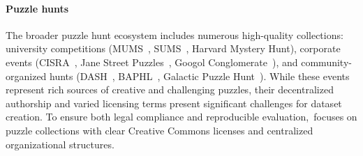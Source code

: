 \paragraph{Puzzle hunts}
The broader puzzle hunt ecosystem includes numerous high-quality collections: university competitions (MUMS~\citep{mums}, SUMS~\citep{sums}, Harvard Mystery Hunt\citep{harvard}), corporate events (CISRA~\citep{cisra}, Jane Street Puzzles~\citep{janestreet}, Googol Conglomerate~\citep{googol}), and community-organized hunts (DASH~\citep{dash}, BAPHL~\citep{baphl}, Galactic Puzzle Hunt~\citep{galactic}). 
While these events represent rich sources of creative and challenging puzzles, their decentralized authorship and varied licensing terms present significant challenges for dataset creation.
To ensure both legal compliance and reproducible evaluation,~\enigmaeval focuses on puzzle collections with clear Creative Commons licenses and centralized organizational structures.



